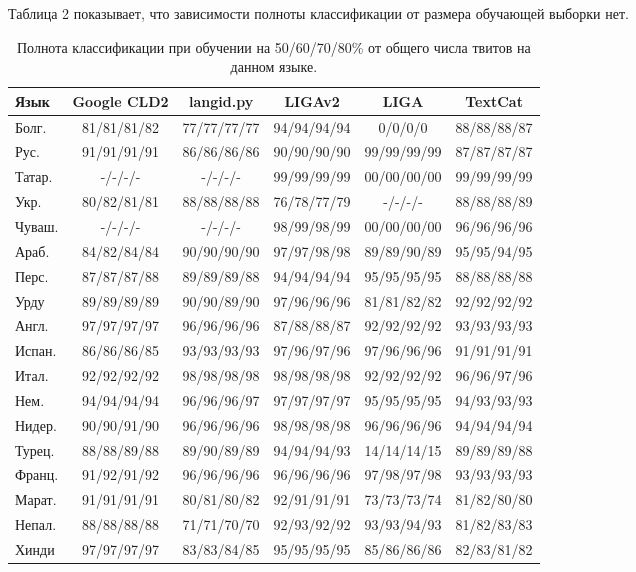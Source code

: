 \documentclass[a4paper, 14pt]{article}
\begin{document}
		Таблица 2 показывает, что зависимости полноты классификации от размера обучающей выборки нет.
\begin{center}
\begin{table}
\begin{tabular*}{1.07\textwidth}{| l| *{5}{|c} |}
\hline 
Язык & Google CLD2 & langid.py & LIGAv2 & LIGA & TextCat \\
\hline
\hline
Болг. & 81/81/81/82 & 77/77/77/77 & 94/94/94/94 & 0/0/0/0 & 88/88/88/87 \\
Рус. & 91/91/91/91 & 86/86/86/86 & 90/90/90/90 & 99/99/99/99 & 87/87/87/87 \\
Татар. & -/-/-/- & -/-/-/- & 99/99/99/99 & 00/00/00/00 & 99/99/99/99 \\
Укр. & 80/82/81/81 & 88/88/88/88 & 76/78/77/79 & -/-/-/- & 88/88/88/89 \\
Чуваш. & -/-/-/- & -/-/-/- & 98/99/98/99 & 00/00/00/00 & 96/96/96/96 \\
\hline
\hline
Араб. & 84/82/84/84 & 90/90/90/90 & 97/97/98/98 & 89/89/90/89 & 95/95/94/95 \\
Перс. & 87/87/87/88 & 89/89/89/88 & 94/94/94/94 & 95/95/95/95 & 88/88/88/88 \\
Урду & 89/89/89/89 & 90/90/89/90 & 97/96/96/96 & 81/81/82/82 & 92/92/92/92 \\
\hline
\hline
Англ. & 97/97/97/97 & 96/96/96/96 & 87/88/88/87 & 92/92/92/92 & 93/93/93/93 \\
Испан. & 86/86/86/85 & 93/93/93/93 & 97/96/97/96 & 97/96/96/96 & 91/91/91/91 \\
Итал. & 92/92/92/92 & 98/98/98/98 & 98/98/98/98 & 92/92/92/92 & 96/96/97/96 \\
Нем. & 94/94/94/94 & 96/96/96/97 & 97/97/97/97 & 95/95/95/95 & 94/93/93/93 \\
Нидер. & 90/90/91/90 & 96/96/96/96 & 98/98/98/98 & 96/96/96/96 & 94/94/94/94 \\
Турец. & 88/88/89/88 & 89/90/89/89 & 94/94/94/93 & 14/14/14/15 & 89/89/89/88 \\
Франц. & 91/92/91/92 & 96/96/96/96 & 96/96/96/96 & 97/98/97/98 & 93/93/93/93 \\
\hline
\hline
Марат. & 91/91/91/91 & 80/81/80/82 & 92/91/91/91 & 73/73/73/74 & 81/82/80/80 \\
Непал. & 88/88/88/88 & 71/71/70/70 & 92/93/92/92 & 93/93/94/93 & 81/82/83/83 \\
Хинди & 97/97/97/97 & 83/83/84/85 & 95/95/95/95 & 85/86/86/86 & 82/83/81/82 \\
\hline
\end{tabular*}
\caption{Полнота классификации при обучении на 50/60/70/80\% от общего числа твитов на данном языке.}
\end{table}
\end{center}
\end{document}
